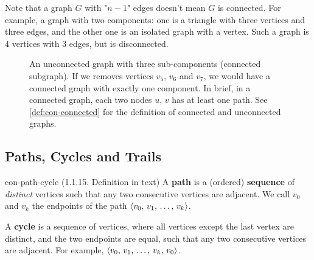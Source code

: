 \documentclass[../src/handouts/main.tex]{subfiles}
\begin{document}
Note that a graph $G$ with "$n - 1$" edges doesn't mean $G$ is connected. For example, a graph with two components: one is a triangle with three vertices and three edges, and the other one is an isolated graph with a vertex. Such a graph is 4 vertices with 3 edges, but is disconnected.


\begin{figure}[htbp]
  \centering
  \caption{An unconnected graph with three sub-components (connected subgraph). If we removes vertices $v_5$, $v_6$ and $v_7$, we would have a connected graph with exactly one component. In brief, in a connected graph, each two nodes $u,\, v$ has at least one path. See \cref{def:con-connected} for the definition of connected and unconnected graphs.}
  \label{fig:con-connected-graph-interlude}
\end{figure}

\subsection{Paths, Cycles and Trails}\label{subsec:con-path}

\begin{definition}{}{con-path-cycle}
  (1.1.15. Definition in text)
  A \textbf{path} is a (ordered) \textbf{sequence} of \textit{distinct} vertices such that any two consecutive vertices are adjacent. We call $v_0$ and $v_k$ the endpoints of the path $\langle v_0,\, v_1,\, \ldots,\, v_k\rangle$.

  A \textbf{cycle} is a sequence of vertices, where all vertices except the last vertex are distinct, and the two endpoints are equal, such that any two consecutive vertices are adjacent. For example, $\langle v_0,\, v_1,\, \ldots,\, v_k,\, v_0\rangle$.
\end{definition}
\end{document}
